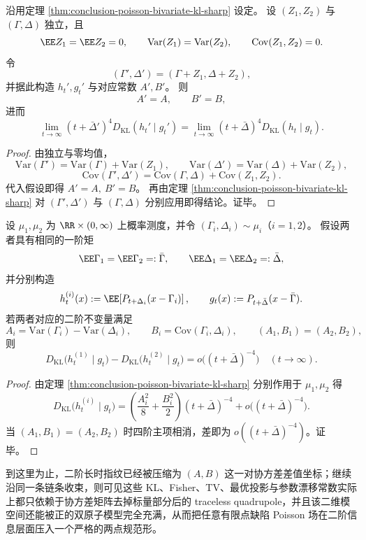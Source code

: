 \begin{proposition}\label{prop:conclusion-poisson-bivariate-isotropic-noise-invariance}
沿用定理 \ref{thm:conclusion-poisson-bivariate-kl-sharp} 设定。
设 \((Z_1,Z_2)\) 与 \((\Gamma,\Delta)\) 独立，且
\[
\EE Z_1=\EE Z_2=0,\qquad
\mathrm{Var}(Z_1)=\mathrm{Var}(Z_2),\qquad
\mathrm{Cov}(Z_1,Z_2)=0.
\]
令
\[
(\Gamma',\Delta')=(\Gamma+Z_1,\Delta+Z_2),
\]
并据此构造 \(h_t',g_t'\) 与对应常数 \(A',B'\)。
则
\[
A'=A,\qquad B'=B,
\]
进而
\[
\lim_{t\to\infty}(t+\bar\Delta')^4D_{\mathrm{KL}}(h_t'\mid g_t')
=\lim_{t\to\infty}(t+\bar\Delta)^4D_{\mathrm{KL}}(h_t\mid g_t).
\]
\end{proposition}
\begin{proof}
由独立与零均值，
\[
\mathrm{Var}(\Gamma')=\mathrm{Var}(\Gamma)+\mathrm{Var}(Z_1),\qquad
\mathrm{Var}(\Delta')=\mathrm{Var}(\Delta)+\mathrm{Var}(Z_2),
\]
\[
\mathrm{Cov}(\Gamma',\Delta')=\mathrm{Cov}(\Gamma,\Delta)+\mathrm{Cov}(Z_1,Z_2).
\]
代入假设即得 \(A'=A,\ B'=B\)。
再由定理 \ref{thm:conclusion-poisson-bivariate-kl-sharp} 对 \((\Gamma',\Delta')\) 与 \((\Gamma,\Delta)\) 分别应用即得结论。证毕。
\end{proof}

\begin{proposition}\label{prop:conclusion-poisson-bivariate-nohair}
设 \(\mu_1,\mu_2\) 为 \(\RR\times(0,\infty)\) 上概率测度，并令 \((\Gamma_i,\Delta_i)\sim\mu_i\)（\(i=1,2\)）。
假设两者具有相同的一阶矩
\[
\EE\Gamma_1=\EE\Gamma_2=:\bar\Gamma,\qquad
\EE\Delta_1=\EE\Delta_2=:\bar\Delta,
\]
并分别构造
\[
h_t^{(i)}(x):=\EE\!\left[P_{t+\Delta_i}(x-\Gamma_i)\right],
\qquad
g_t(x):=P_{t+\bar\Delta}(x-\bar\Gamma).
\]
若两者对应的二阶不变量满足
\[
A_i=\mathrm{Var}(\Gamma_i)-\mathrm{Var}(\Delta_i),\qquad
B_i=\mathrm{Cov}(\Gamma_i,\Delta_i),
\qquad
(A_1,B_1)=(A_2,B_2),
\]
则
\[
D_{\mathrm{KL}}\!\bigl(h_t^{(1)}\mid g_t\bigr)-D_{\mathrm{KL}}\!\bigl(h_t^{(2)}\mid g_t\bigr)
=o\bigl((t+\bar\Delta)^{-4}\bigr)\quad(t\to\infty).
\]
\end{proposition}
\begin{proof}
由定理 \ref{thm:conclusion-poisson-bivariate-kl-sharp} 分别作用于 \(\mu_1,\mu_2\) 得
\[
D_{\mathrm{KL}}\!\bigl(h_t^{(i)}\mid g_t\bigr)
=\left(\frac{A_i^2}{8}+\frac{B_i^2}{2}\right)(t+\bar\Delta)^{-4}+o\bigl((t+\bar\Delta)^{-4}\bigr).
\]
当 \((A_1,B_1)=(A_2,B_2)\) 时四阶主项相消，差即为 \(o((t+\bar\Delta)^{-4})\)。证毕。
\end{proof}

到这里为止，二阶长时指纹已经被压缩为 \((A,B)\) 这一对协方差差值坐标；继续沿同一条链条收束，则可见这些 KL、Fisher、TV、最优投影与参数漂移常数实际上都只依赖于协方差矩阵去掉标量部分后的 traceless quadrupole，并且该二维模空间还能被正的双原子模型完全充满，从而把任意有限点缺陷 Poisson 场在二阶信息层面压入一个严格的两点规范形。




